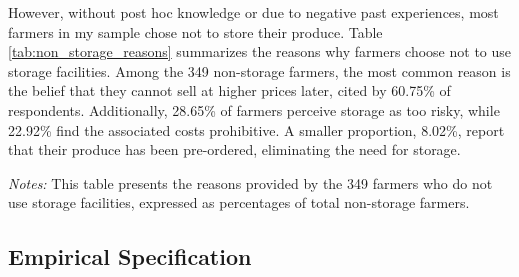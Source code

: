 \documentclass[12pt]{article}
\begin{document}
However, without post hoc knowledge or due to negative past experiences, most farmers in my sample chose not to store their produce. Table \ref{tab:non_storage_reasons} summarizes the reasons why farmers choose not to use storage facilities. Among the 349 non-storage farmers, the most common reason is the belief that they cannot sell at higher prices later, cited by 60.75\% of respondents. Additionally, 28.65\% of farmers perceive storage as too risky, while 22.92\% find the associated costs prohibitive. A smaller proportion, 8.02\%, report that their produce has been pre-ordered, eliminating the need for storage.

\begin{table}[H]
    \centering
    \footnotesize
    \caption{Reasons for Not Using Storage Facilities}
    \label{tab:non_storage_reasons}
        \begin{tablenotes}
            \item \textit{Notes:} This table presents the reasons provided by the 349 farmers who do not use storage facilities, expressed as percentages of total non-storage farmers.
        \end{tablenotes}
\end{table}


\newpage
\subsection{Empirical Specification}
\end{document}
